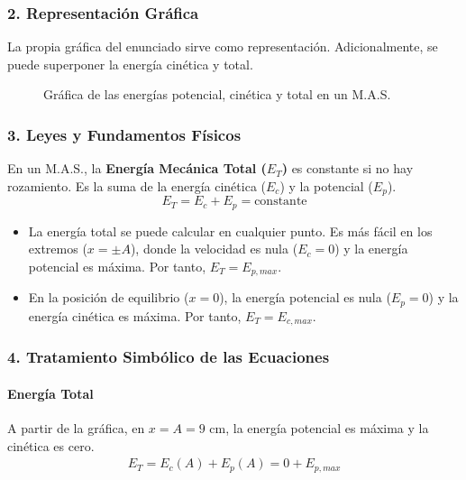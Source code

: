 \subsubsection*{2. Representación Gráfica}
La propia gráfica del enunciado sirve como representación. Adicionalmente, se puede superponer la energía cinética y total.
\begin{figure}[H]
    \centering
    \caption{Gráfica de las energías potencial, cinética y total en un M.A.S.}
\end{figure}

\subsubsection*{3. Leyes y Fundamentos Físicos}
En un M.A.S., la \textbf{Energía Mecánica Total ($E_T$)} es constante si no hay rozamiento. Es la suma de la energía cinética ($E_c$) y la potencial ($E_p$).
$$ E_T = E_c + E_p = \text{constante} $$
\begin{itemize}
    \item La energía total se puede calcular en cualquier punto. Es más fácil en los extremos ($x=\pm A$), donde la velocidad es nula ($E_c=0$) y la energía potencial es máxima. Por tanto, $E_T = E_{p,max}$.
    \item En la posición de equilibrio ($x=0$), la energía potencial es nula ($E_p=0$) y la energía cinética es máxima. Por tanto, $E_T = E_{c,max}$.
\end{itemize}

\subsubsection*{4. Tratamiento Simbólico de las Ecuaciones}
\paragraph*{Energía Total}
A partir de la gráfica, en $x=A=9$ cm, la energía potencial es máxima y la cinética es cero.
\begin{gather}
    E_T = E_c(A) + E_p(A) = 0 + E_{p,max}
\end{gather}
